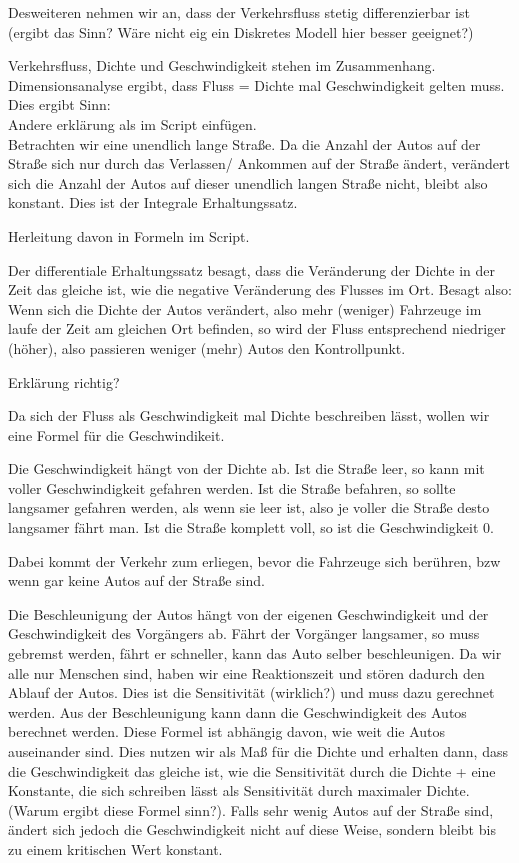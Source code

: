 \documentclass[]{article}
\begin{document}
Desweiteren nehmen wir an, dass der Verkehrsfluss stetig differenzierbar ist (ergibt das Sinn? Wäre nicht eig ein Diskretes Modell hier besser geeignet?)

Verkehrsfluss, Dichte und Geschwindigkeit stehen im Zusammenhang. Dimensionsanalyse ergibt, dass Fluss = Dichte mal Geschwindigkeit gelten muss. Dies ergibt Sinn:  \\

Andere erklärung als im Script einfügen. \\

Betrachten wir eine unendlich lange Straße. Da die Anzahl der Autos auf der Straße sich nur durch das Verlassen/ Ankommen auf der Straße ändert, verändert sich die Anzahl der Autos auf dieser unendlich langen Straße nicht, bleibt also konstant. Dies ist der Integrale Erhaltungssatz. 

Herleitung davon in Formeln im Script. 

Der differentiale Erhaltungssatz besagt, dass die Veränderung der Dichte in der Zeit das gleiche ist, wie die negative Veränderung des Flusses im Ort. Besagt also: Wenn sich die Dichte der Autos verändert, also mehr (weniger) Fahrzeuge im laufe der Zeit am gleichen Ort befinden, so wird der Fluss entsprechend niedriger (höher), also passieren weniger (mehr) Autos den Kontrollpunkt. 

Erklärung richtig? 

Da sich der Fluss als Geschwindigkeit mal Dichte beschreiben lässt, wollen wir eine Formel für die Geschwindikeit. 

Die Geschwindigkeit hängt von der Dichte ab. Ist die Straße leer, so kann mit voller Geschwindigkeit gefahren werden. Ist die Straße befahren, so sollte langsamer gefahren werden, als wenn sie leer ist, also je voller die Straße desto langsamer fährt man. Ist die Straße komplett voll, so ist die Geschwindigkeit 0. 

Dabei kommt der Verkehr zum erliegen, bevor die Fahrzeuge sich berühren, bzw wenn gar keine Autos auf der Straße sind. 

Die Beschleunigung der Autos hängt von der eigenen Geschwindigkeit und der Geschwindigkeit des Vorgängers ab. Fährt der Vorgänger langsamer, so muss gebremst werden, fährt er schneller, kann das Auto selber beschleunigen. Da wir alle nur Menschen sind, haben wir eine Reaktionszeit und stören dadurch den Ablauf der Autos. Dies ist die Sensitivität (wirklich?) und muss dazu gerechnet werden. Aus der Beschleunigung kann dann die Geschwindigkeit des Autos berechnet werden. Diese Formel ist abhängig davon, wie weit die Autos auseinander sind. Dies nutzen wir als Maß für die Dichte und erhalten dann, dass die Geschwindigkeit das gleiche ist, wie die Sensitivität durch die Dichte + eine Konstante, die sich schreiben lässt als Sensitivität durch maximaler Dichte. (Warum ergibt diese Formel sinn?). Falls sehr wenig Autos auf der Straße sind, ändert sich jedoch die Geschwindigkeit nicht auf diese Weise, sondern bleibt bis zu einem kritischen Wert konstant. 
\end{document}
